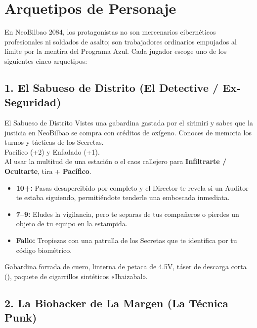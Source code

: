 \chapter{Arquetipos de Personaje}


En NeoBilbao 2084, los protagonistas no son mercenarios cibernéticos profesionales ni soldados de asalto; son trabajadores ordinarios empujados al límite por la mentira del Programa Azul. Cada jugador escoge uno de los siguientes cinco arquetipos:

\section{1. El Sabueso de Distrito (El Detective / Ex-Seguridad)}

\begin{FichaArquetipo}{El Sabueso de Distrito}
Vistes una gabardina gastada por el sirimiri y sabes que la justicia en NeoBilbao se compra con créditos de oxígeno. Conoces de memoria los turnos y tácticas de los Secretas.\\
 Pacífico (+2) y Enfadado (+1).\\
 Al usar la multitud de una estación o el caos callejero para \textbf{Infiltrarte / Ocultarte}, tira + \textbf{Pacífico}.
\begin{itemize}
  \item \textbf{10+:} Pasas desapercibido por completo y el Director te revela si un Auditor te estaba siguiendo, permitiéndote tenderle una emboscada inmediata.
  \item \textbf{7--9:} Eludes la vigilancia, pero te separas de tus compañeros o pierdes un objeto de tu equipo en la estampida.
  \item \textbf{Fallo:} Tropiezas con una patrulla de los Secretas que te identifica por tu código biométrico.
\end{itemize}
 Gabardina forrada de cuero, linterna de petaca de 4.5V, táser de descarga corta (), paquete de cigarrillos sintéticos «Ibaizabal».
\end{FichaArquetipo}

\section{2. La Biohacker de La Margen (La Técnica Punk)}

